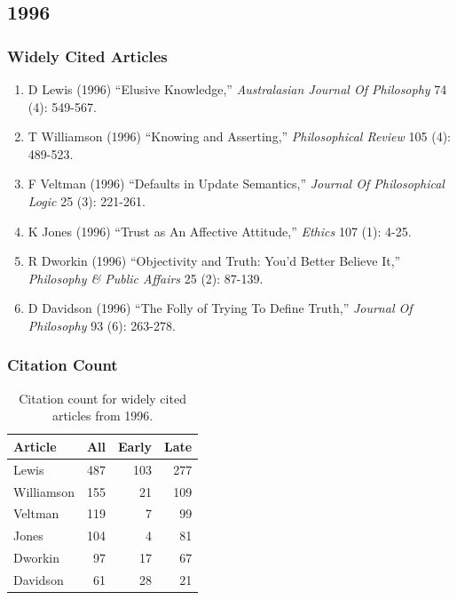 \documentclass[
  10pt,
  letterpaper,
  DIV=11,
  numbers=noendperiod,
  twoside]{scrartcl}
\providecommand{\tightlist}{%
  \setlength{\itemsep}{0pt}\setlength{\parskip}{0pt}}\usepackage{longtable,booktabs,array}
\begin{document}
\newpage

\subsection{1996}\label{sec-s1996}

\subsubsection*{Widely Cited Articles}\label{widely-cited-articles-40}

\begin{enumerate}
\def\labelenumi{\arabic{enumi}.}
\tightlist
\item
  D Lewis (1996) ``Elusive Knowledge,'' \emph{Australasian Journal Of
  Philosophy} 74 (4): 549-567.
\item
  T Williamson (1996) ``Knowing and Asserting,'' \emph{Philosophical
  Review} 105 (4): 489-523.
\item
  F Veltman (1996) ``Defaults in Update Semantics,'' \emph{Journal Of
  Philosophical Logic} 25 (3): 221-261.
\item
  K Jones (1996) ``Trust as An Affective Attitude,'' \emph{Ethics} 107
  (1): 4-25.
\item
  R Dworkin (1996) ``Objectivity and Truth: You'd Better Believe It,''
  \emph{Philosophy \& Public Affairs} 25 (2): 87-139.
\item
  D Davidson (1996) ``The Folly of Trying To Define Truth,''
  \emph{Journal Of Philosophy} 93 (6): 263-278.
\end{enumerate}

\subsubsection*{Citation Count}\label{sec-count-1996}

\begin{longtable}[]{@{}lrrr@{}}

\caption{\label{tbl-citation-count-1996}Citation count for widely cited
articles from 1996.}

\tabularnewline

\toprule\noalign{}
Article & All & Early & Late \\
\midrule\noalign{}
\endhead
\bottomrule\noalign{}
\endlastfoot
Lewis & 487 & 103 & 277 \\
Williamson & 155 & 21 & 109 \\
Veltman & 119 & 7 & 99 \\
Jones & 104 & 4 & 81 \\
Dworkin & 97 & 17 & 67 \\
Davidson & 61 & 28 & 21 \\

\end{longtable}
\end{document}
